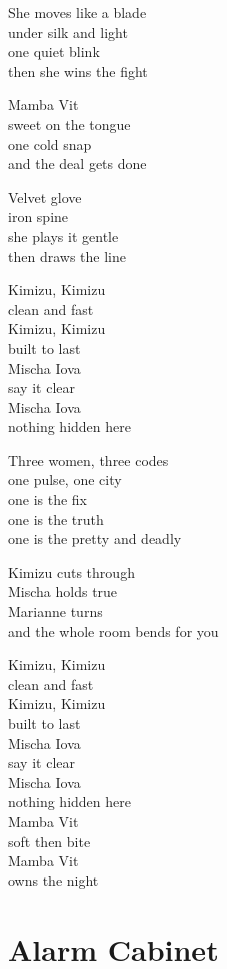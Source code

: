 \begin{lyrics}
She moves like a blade\\
under silk and light\\
one quiet blink\\
then she wins the fight

Mamba Vit\\
sweet on the tongue\\
one cold snap\\
and the deal gets done

Velvet glove\\
iron spine\\
she plays it gentle\\
then draws the line

Kimizu, Kimizu\\
clean and fast\\
Kimizu, Kimizu\\
built to last\\
Mischa Iova\\
say it clear\\
Mischa Iova\\
nothing hidden here

Three women, three codes\\
one pulse, one city\\
one is the fix\\
one is the truth\\
one is the pretty and deadly

Kimizu cuts through\\
Mischa holds true\\
Marianne turns\\
and the whole room bends for you

Kimizu, Kimizu\\
clean and fast\\
Kimizu, Kimizu\\
built to last\\
Mischa Iova\\
say it clear\\
Mischa Iova\\
nothing hidden here\\
Mamba Vit\\
soft then bite\\
Mamba Vit\\
owns the night

\end{lyrics}

\section{Alarm Cabinet}

